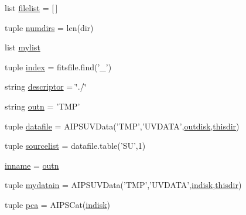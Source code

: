 \begin{DoxyCompactItemize}
list \hyperlink{namespacee_m_e_r_l_i_n__load_a791ab43c58660bbfbffff06618ec5572}{filelist} = \mbox{[}$\,$\mbox{]}
\item 
tuple \hyperlink{namespacee_m_e_r_l_i_n__load_a41b837603f274d41cb8c83c654ebc48d}{numdirs} = len(dir)
\item 
list \hyperlink{namespacee_m_e_r_l_i_n__load_ab343adec8c60c6e452705f4603f72e0d}{mylist}
\item 
tuple \hyperlink{namespacee_m_e_r_l_i_n__load_af2bd25598bd280e936345cb1fdb1f0a8}{index} = fitsfile.\-find('\-\_\-')
\item 
string \hyperlink{namespacee_m_e_r_l_i_n__load_aebf7fb360efe7bf780864dff8e409e53}{descriptor} = \char`\"{}./\char`\"{}
\item 
string \hyperlink{namespacee_m_e_r_l_i_n__load_a576f868967e79fe52b54cc6f787f4f88}{outn} = '\-T\-M\-P'
\item 
tuple \hyperlink{namespacee_m_e_r_l_i_n__load_ab7734c045283180c19a27a1855fe9548}{datafile} = \-A\-I\-P\-S\-U\-V\-Data('\-T\-M\-P','\-U\-V\-D\-A\-T\-A',\hyperlink{namespacee_m_e_r_l_i_n__load_a1b1907c1f32abe6b155fca3b653b8150}{outdisk},\hyperlink{namespacee_m_e_r_l_i_n__load_a9071ee4536dd6e3909ef0590d4e0620c}{thisdir})
\item 
tuple \hyperlink{namespacee_m_e_r_l_i_n__load_adf6335ce381e849e02416199918a86d0}{sourcelist} = datafile.\-table('\-S\-U',1)
\item 
\hyperlink{namespacee_m_e_r_l_i_n__load_a3bb206e5b5466d47c10d6b459442d825}{inname} = \hyperlink{namespacee_m_e_r_l_i_n__load_a576f868967e79fe52b54cc6f787f4f88}{outn}
\item 
tuple \hyperlink{namespacee_m_e_r_l_i_n__load_a3f0d999720e445ef452d0411be5a71d3}{mydatain} = \-A\-I\-P\-S\-U\-V\-Data('\-T\-M\-P','\-U\-V\-D\-A\-T\-A',\hyperlink{namespacee_m_e_r_l_i_n__load_af5dbb7c985275442e06db7e9c4d2ed57}{indisk},\hyperlink{namespacee_m_e_r_l_i_n__load_a9071ee4536dd6e3909ef0590d4e0620c}{thisdir})
\item 
tuple \hyperlink{namespacee_m_e_r_l_i_n__load_a12b9c10fdf4743e6e2ab77e841c2ac98}{pca} = \-A\-I\-P\-S\-Cat(\hyperlink{namespacee_m_e_r_l_i_n__load_af5dbb7c985275442e06db7e9c4d2ed57}{indisk})
\end{DoxyCompactItemize}


